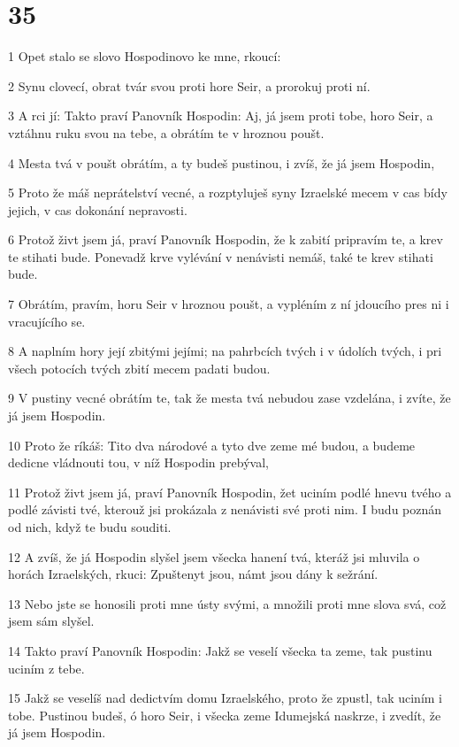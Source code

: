 \chapter{35}

\par 1 Opet stalo se slovo Hospodinovo ke mne, rkoucí:
\par 2 Synu clovecí, obrat tvár svou proti hore Seir, a prorokuj proti ní.
\par 3 A rci jí: Takto praví Panovník Hospodin: Aj, já jsem proti tobe, horo Seir, a vztáhnu ruku svou na tebe, a obrátím te v hroznou poušt.
\par 4 Mesta tvá v poušt obrátím, a ty budeš pustinou, i zvíš, že já jsem Hospodin,
\par 5 Proto že máš neprátelství vecné, a rozptyluješ syny Izraelské mecem v cas bídy jejich, v cas dokonání nepravosti.
\par 6 Protož živt jsem já, praví Panovník Hospodin, že k zabití pripravím te, a krev te stihati bude. Ponevadž krve vylévání v nenávisti nemáš, také te krev stihati bude.
\par 7 Obrátím, pravím, horu Seir v hroznou poušt, a vypléním z ní jdoucího pres ni i vracujícího se.
\par 8 A naplním hory její zbitými jejími; na pahrbcích tvých i v údolích tvých, i pri všech potocích tvých zbití mecem padati budou.
\par 9 V pustiny vecné obrátím te, tak že mesta tvá nebudou zase vzdelána, i zvíte, že já jsem Hospodin.
\par 10 Proto že ríkáš: Tito dva národové a tyto dve zeme mé budou, a budeme dedicne vládnouti tou, v níž Hospodin prebýval,
\par 11 Protož živt jsem já, praví Panovník Hospodin, žet uciním podlé hnevu tvého a podlé závisti tvé, kterouž jsi prokázala z nenávisti své proti nim. I budu poznán od nich, když te budu souditi.
\par 12 A zvíš, že já Hospodin slyšel jsem všecka hanení tvá, kteráž jsi mluvila o horách Izraelských, rkuci: Zpuštenyt jsou, námt jsou dány k sežrání.
\par 13 Nebo jste se honosili proti mne ústy svými, a množili proti mne slova svá, což jsem sám slyšel.
\par 14 Takto praví Panovník Hospodin: Jakž se veselí všecka ta zeme, tak pustinu uciním z tebe.
\par 15 Jakž se veselíš nad dedictvím domu Izraelského, proto že zpustl, tak uciním i tobe. Pustinou budeš, ó horo Seir, i všecka zeme Idumejská naskrze, i zvedít, že já jsem Hospodin.

